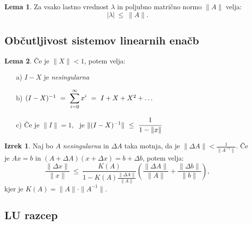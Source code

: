 \documentclass[11pt]{article}
\theoremstyle{definition}
\newtheorem{lema}{Lema}
\newtheorem{izrek}{Izrek}
\begin{document}
\begin{lema}

Za vsako lastno vrednost $\lambda$ in poljubno matrično normo $\|A\|$ velja:
$$|\lambda| ~\leq~ \|A\|.$$

\end{lema} 
\vspace{0.5cm}


\subsection{Občutljivost sistemov linearnih enačb}
\vspace{0.5cm}

\begin{lema}

Če je $\|X\| < 1$, potem velja:
\begin{enumerate}
	\item[a)] $I-X$ je \textit{nesingularna}
	\item[b)] $(I-X)^{-1} ~=~ \mathlarger{\sum_{i=0}^{\infty} x^i} ~=~ I + X + X^2 + \ldots$
	\item[c)] Če je $\|I\| = 1$, ~je $\|(I-X)^{-1}\| ~\leq~ \cfrac{1}{1-\|x\|}$
\end{enumerate}

\end{lema}
\vspace{0.5cm}

\begin{izrek}

Naj bo $A$ \textit{nesingularna} in $\Delta A$ taka motnja, da je $\|\Delta A\| < \frac{1}{\|A^{-1}\|}.$
Če je $Ax = b$ in $(A + \Delta A)(x + \Delta x) = b + \Delta b$, potem velja:
$$\frac{\|\Delta x\|}{\|x\|} ~\leq~ \frac{K(A)}{1 - K(A)\frac{\|\Delta A\|}{\|A\|}} \left( \frac{\|\Delta A\|}{\|A\|} + \frac{\|\Delta b\|}{\|b\|} \right),$$
kjer je $K(A) = \|A\| \cdot \|A^{-1}\|$.

\end{izrek}
\vspace{0.5cm}


\subsection{LU razcep}
\vspace{0.5cm}
\end{document}
